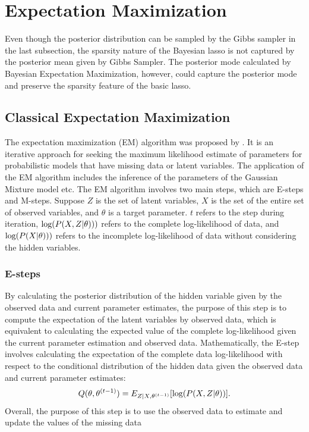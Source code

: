 \section{Expectation Maximization}
Even though the posterior distribution can be sampled by the Gibbs sampler in the last subsection, the sparsity nature of the Bayesian lasso is not captured by the posterior mean given by Gibbs Sampler. The posterior mode calculated by Bayesian Expectation Maximization, however, could capture the posterior mode and preserve the sparsity feature of the basic lasso.

\subsection{Classical Expectation Maximization}
The expectation maximization (EM) algorithm was proposed by \cite{EM}. It is an iterative approach for seeking the maximum likelihood estimate of parameters for probabilistic models that have missing data or latent variables.
The application of the EM algorithm includes the inference of the parameters of the Gaussian Mixture model etc. The EM algorithm involves two main steps, which are E-steps and M-steps.
Suppose $Z$ is the set of latent variables, $X$ is the set of the entire set of observed variables, and $\theta$ is a target parameter. $t$ refers to the step during iteration, $\textnormal{log}(P(X, Z|\theta)))$ refers to the complete log-likelihood of data, and $\textnormal{log}(P(X|\theta)))$ refers to the incomplete log-likelihood of data without considering the hidden variables.
\subsubsection{E-steps}
By calculating the posterior distribution of the hidden variable given by the observed data and current parameter estimates, the purpose of this step is to compute the expectation of the latent variables by observed data, which is equivalent to calculating the expected value of the complete log-likelihood given the current parameter estimation and observed data.
Mathematically, the E-step involves calculating the expectation of the complete data log-likelihood with respect to the conditional distribution of the hidden data given the observed data and current parameter estimates:
\begin{equation}
	Q(\theta,\theta^{(t-1)}) = E_{Z|X,\theta^{(t-1)}}[\textnormal{log}(P(X,Z|\theta))].
\end{equation}
Overall, the purpose of this step is to use the observed data to estimate and update the values of the missing data

